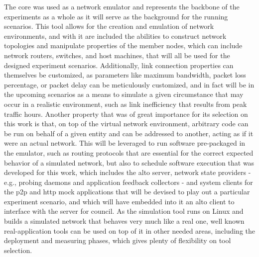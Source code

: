     The \gls{core} \cite{core} was used as a network emulator and represents the backbone of the experiments as a whole as it will serve as the background for the running scenarios.
    This tool allows for the creation and emulation of network environments, and with it are included the abilities to construct network topologies and manipulate properties of the member nodes, which can include network routers, switches, and host machines, that will all be used for the designed experiment scenarios.
    Additionally, link connection properties can themselves be customized, as parameters like maximum bandwidth, packet loss percentage, or packet delay can be meticulously customized, and in fact will be in the upcoming scenarios as a means to simulate a given circumstance that may occur in a realistic environment, such as link inefficiency that results from peak traffic hours.
    Another property that was of great importance for its selection on this work is that, on top of the virtual network environment, arbitrary code can be run on behalf of a given entity and can be addressed to another, acting as if it were an actual network.
    This will be leveraged to run software pre-packaged in the emulator, such as routing protocols that are essential for the correct expected behavior of a simulated network, but also to schedule software execution that was developed for this work, which includes the \gls{alto} server, network state providers - e.g., probing daemons and application feedback collectors - and system clients for the \gls{p2p} and \gls{http} mock applications that will be devised to play out a particular experiment scenario, and which will have embedded into it an \gls{alto} client to interface with the server for council.
    As the simulation tool runs on Linux and builds a simulated network that behaves very much like a real one, well known real-application tools can be used on top of it in other needed areas, including the deployment and measuring phases, which gives plenty of flexibility on tool selection.


